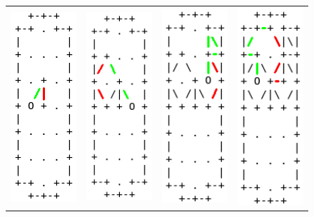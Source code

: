 \documentclass[licencjacka]{pracamgr}
\begin{document}
\begin{figure}
\centering
\setlength{\tabcolsep}{5mm}
\begin{tabular}{cccc}
  \includegraphics[width=25mm]{small0} & \includegraphics[width=25mm]{small1} & 
  \includegraphics[width=25mm]{small2} & \includegraphics[width=25mm]{small3} \\

\end{tabular}
\end{figure}
\end{document}
